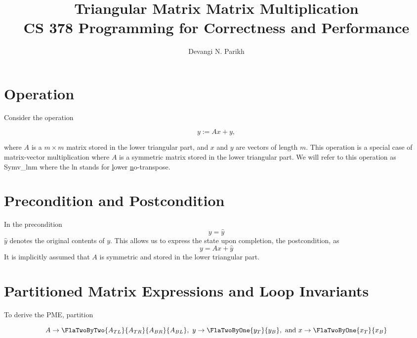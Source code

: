 \documentclass[12pt]{article}
\title{Triangular Matrix Matrix Multiplication \\ CS 378 Programming for Correctness and Performance}
\author{Devangi N. Parikh}
\begin{document}
	\maketitle

\section{Operation}
Consider the operation 

\[y := Ax + y,\]

where $A$ is a $m \times m$ matrix stored in the lower triangular part, and $x$
and $y$ are vectors of length $m$. This operation is a special case of
matrix-vector multiplication where $A$ is a symmetric matrix stored in the lower
triangular part. We will refer to this operation as {\sc Symv\_ln}m where the
{\sc ln} stands for 
\underline{l}ower
\underline{n}o-transpose.



\section{Precondition and Postcondition}

In the precondition 
\[
y = \widehat y
\]
$ \widehat y $ denotes the original contents of $ y $.
This allows us to express the state upon completion, the postcondition, as
\[
y = Ax + \widehat y
\]
It is implicitly assumed that $ A $  is symmetric and stored in the lower
triangular part. 

\section{Partitioned Matrix Expressions and Loop Invariants}

To derive the PME, partition 

\[ A \rightarrow \FlaTwoByTwo{A_{TL}}{A_{TR}}{A_{BR}}{A_{BL}},~
 y \rightarrow \FlaTwoByOne{y_{T}}{y_B}, \text{~and~} x \rightarrow \FlaTwoByOne{x_{T}}{x_B}  \]
\end{document}
